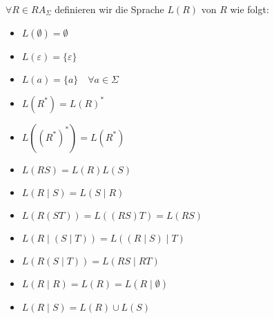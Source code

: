 \begin{concept}
    {$\forall  R \in R A_{\Sigma}$} definieren wir die Sprache $L(R)$ von $R$ wie folgt:\\
    \begin{minipage}{0.4\linewidth}
        \begin{itemize}
            \item $L(\emptyset)=\emptyset$
            \item $L(\varepsilon)=\{\varepsilon\}$
            \item $L(a)=\{a\} \quad \forall a \in \Sigma$
            \item $L(R^{*})=L(R)^{*}$
            \item $L((R^{*})^{*})=L(R^{*})$
            \item $L(R S) = L(R)L(S)$
            
        \end{itemize}
    \end{minipage}
    \begin{minipage}{0.55\linewidth}
        \begin{itemize}
            \item $L(R \mid S) = L(S \mid R)$
            \item $L(R(ST))=L((RS)T)=L(R S)$
            \item $L(R \mid (S \mid T))=L((R \mid S) \mid T)$
            \item $L(R(S \mid T))= L(RS \mid RT)$
            \item $L(R \mid R)=L(R)=L(R \mid \emptyset)$
            \item $L(R \mid S)=L(R) \cup L(S)$
        \end{itemize}
    \end{minipage}
\end{concept}









